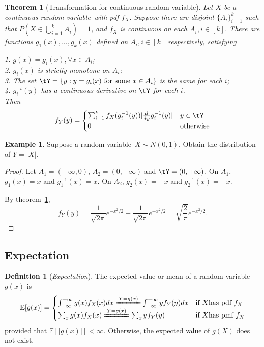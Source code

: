 \documentclass[11pt]{article}
\theoremstyle{plain}
\newtheorem{thm}{Theorem}[section]
\theoremstyle{definition}
\newtheorem{defn}{Definition}
\newtheorem{example}{Example}
\begin{document}
\begin{thm}[Transformation for continuous random variable]\label{thm:transf}
	Let $X$ be a continuous random variable\ with pdf $f_X$. Suppose there are disjoint $\{A_i\}_{i=1}^{k}$ such that $P(X \in \bigcup_{i = 1}^k A_i) = 1$, and $f_X$ is continuous on each $A_i, i \in [k]$. There are functions $g_1(x),...,g_k(x)$ defined on $A_i, i \in [k]$  respectively, satisfying
	
	1. $g(x) = g_i(x), \forall x \in A_i$;\\
	2. $g_i(x)$ is strictly monotone on $A_i$;\\
	3. The set $\tY = \{ y: y = g_i(x)  \text{ for some } x \in A_i\}$ is the same for each $i$;\\
	4. $g^{-t}_i (y)$ has a continuous derivative on $\tY$ for each $i$.\\
	Then 
	\begin{align}
		f_Y(y) = \begin{cases} \sum_{i = 1}^k 
		f_X(g_i^{-1}(y)) \vert \frac{d}{dy} g_i^{-1}(y)\vert & y \in \tY\\
		0 & \text{otherwise}
	\end{cases}
	\end{align}
\end{thm}

\begin{example} Suppose a random variable\ $X \sim N(0,1)$. Obtain the distribution of $Y = |X|$.
\end{example}

\begin{proof}
	Let $A_1 = (-\infty, 0)$, $A_2 =(0, +\infty )$ and $\tY = (0,+\infty)$. On $A_1$, $g_1(x) = x$ and $g_1^{-1}(x) = x$. On $A_2$, $g_2(x) = -x$ and $g_2^{-1}(x) = -x$. 
	
	By theorem~\ref{thm:transf}, 
	\[  f_Y(y) = \frac{1}{\sqrt{2\pi}} e^{-x^2/2} + \frac{1}{\sqrt{2\pi}} e^{-x^2/2} =  \sqrt{ \frac{2}{\pi}} e^{-x^2/2}.  \]
\end{proof}

\subsection{Expectation}
\begin{defn}[\textit{Expectation}]\label{def:expectation}
The expected value or mean of a random variable\ $g(x)$ is 
\begin{align}
	\mathbb{E}[g(x)] = \begin{cases} 
 	\int_{-\infty}^{+\infty} g(x) f_X(x) dx \xlongequal{Y = g(x)} \int_{-\infty}^{+\infty} y f_Y(y) dx  & \text{if } X \text{has pdf }f_X\\
 	\sum_x g(x) f_X(x)\xlongequal{Y = g(x)} \sum_x y f_Y(y)  & \text{if } X \text{has pmf }f_X
 \end{cases}
\end{align} 
	provided that $\mathbb{E}[|g(x)|] < \infty$. Otherwise, the expected value of $g(X)$ does not exist.
\end{defn}
\end{document}

